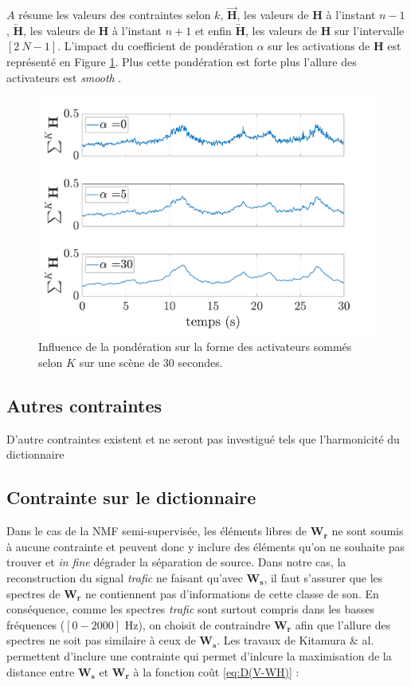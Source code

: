 $A$ résume les valeurs des contraintes selon $k$, $\overrightarrow{\mathbf{H}}$, les valeurs de $\mathbf{H}$ à l'instant $n-1$, $\overleftarrow{\mathbf{H}}$, les valeurs de $\mathbf{H}$ à l'instant $n+1$ et enfin $\overleftrightarrow{\mathbf{H}}$, les valeurs de $\mathbf{H}$ sur l'intervalle $\left[2~N-1 \right]$. L'impact du coefficient de pondération $\alpha$ sur les activations de $\mathbf{H}$ est représenté en Figure \ref{fig:smoothnessExample}. Plus cette pondération est forte plus l'allure des activateurs est \textit{smooth} .

\begin{figure}[hbtp]
\centering
	\includegraphics[width=0.7\linewidth]{./figures/NMF/smoothness_02.pdf}
\caption{Influence de la pondération sur la forme des activateurs sommés selon $K$ sur une scène de 30 secondes.}
\label{fig:smoothnessExample}
\end{figure}

\subsection{Autres contraintes}

D'autre contraintes existent et ne seront pas investigué tels que l'harmonicité du dictionnaire


\subsection{Contrainte sur le dictionnaire}

Dans le cas de la NMF semi-supervisée, les éléments libres de $\mathbf{W_r}$ ne sont soumis à aucune contrainte et peuvent donc y inclure des éléments qu'on ne souhaite pas trouver et \textit{in fine} dégrader la séparation de source. Dans notre cas, la reconstruction du signal \textit{trafic} ne faisant qu'avec $\mathbf{W_s}$, il faut s'assurer que les spectres de $\mathbf{W_r}$ ne contiennent pas d'informations de cette classe de son. En conséquence, comme les spectres \textit{trafic} sont surtout compris dans les basses fréquences ($\left[0-2000 \right]$ Hz), on choisit  de contraindre $\mathbf{W_r}$ afin que l'allure des spectres ne soit pas similaire à ceux de $\mathbf{W_s}$. Les travaux de Kitamura $\&$ al. \cite{kitamura} permettent d'inclure une contrainte qui permet d'inlcure la maximisation de la distance entre $\mathbf{W_s}$ et $\mathbf{W_r}$ à la fonction coût \ref{eq:D(V-WH)} : 

